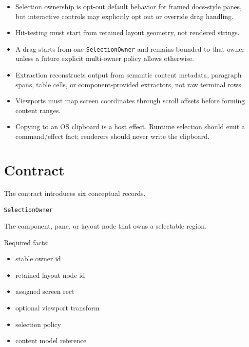 \begin{itemize}
\tightlist
\item
  Selection ownership is opt-out default behavior for framed docs-style panes, but interactive controls may explicitly opt out or override drag handling.
\item
  Hit-testing must start from retained layout geometry, not rendered strings.
\item
  A drag starts from one \texttt{S\allowbreak{}e\allowbreak{}l\allowbreak{}e\allowbreak{}c\allowbreak{}t\allowbreak{}i\allowbreak{}o\allowbreak{}n\allowbreak{}O\allowbreak{}w\allowbreak{}n\allowbreak{}e\allowbreak{}r} and remains bounded to that owner unless a future explicit multi-owner policy allows otherwise.
\item
  Extraction reconstructs output from semantic content metadata, paragraph spans, table cells, or component-provided extractors, not raw terminal rows.
\item
  Viewports must map screen coordinates through scroll offsets before forming content ranges.
\item
  Copying to an OS clipboard is a host effect. Runtime selection should emit a command/effect fact; renderers should never write the clipboard.
\end{itemize}

\section{Contract}\label{record-127-contract}

The contract introduces six conceptual records.

\texttt{S\allowbreak{}e\allowbreak{}l\allowbreak{}e\allowbreak{}c\allowbreak{}t\allowbreak{}i\allowbreak{}o\allowbreak{}n\allowbreak{}O\allowbreak{}w\allowbreak{}n\allowbreak{}e\allowbreak{}r}

The component, pane, or layout node that owns a selectable region.

Required facts:

\begin{itemize}
\tightlist
\item
  stable owner id
\item
  retained layout node id
\item
  assigned screen rect
\item
  optional viewport transform
\item
  selection policy
\item
  content model reference
\end{itemize}

